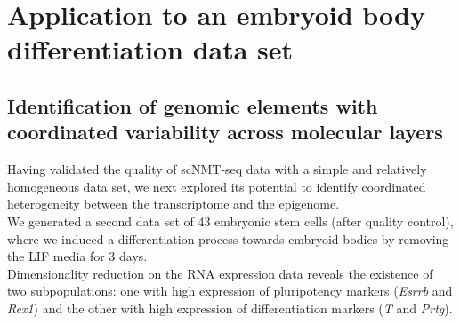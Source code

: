 

\section{Application to an embryoid body differentiation data set}

\subsection{Identification of genomic elements with coordinated variability across molecular layers}

Having validated the quality of scNMT-seq data with a simple and relatively homogeneous data set, we next explored its potential to identify coordinated heterogeneity between the transcriptome and the epigenome.\\
We generated a second data set of 43 embryonic stem cells (after quality control), where we induced a differentiation process towards embryoid bodies by removing the LIF media for 3 days.\\Dimensionality reduction on the RNA expression data reveals the existence of two subpopulations: one with high expression of pluripotency markers (\textit{Esrrb} and \textit{Rex1}) and the other with high expression of differentiation markers (\textit{T} and \textit{Prtg}).



